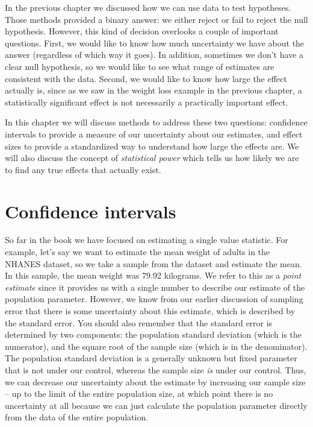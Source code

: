 \documentclass[
  12pt,
]{book}
\begin{document}
In the previous chapter we discussed how we can use data to test hypotheses. Those methods provided a binary answer: we either reject or fail to reject the null hypothesis. However, this kind of decision overlooks a couple of important questions. First, we would like to know how much uncertainty we have about the answer (regardless of which way it goes). In addition, sometimes we don't have a clear null hypothesis, so we would like to see what range of estimates are consistent with the data. Second, we would like to know how large the effect actually is, since as we saw in the weight loss example in the previous chapter, a statistically significant effect is not necessarily a practically important effect.

In this chapter we will discuss methods to address these two questions: confidence intervals to provide a measure of our uncertainty about our estimates, and effect sizes to provide a standardized way to understand how large the effects are. We will also discuss the concept of \emph{statistical power} which tells us how likely we are to find any true effects that actually exist.

\hypertarget{confidence-intervals}{%
\section{Confidence intervals}\label{confidence-intervals}}

So far in the book we have focused on estimating a single value statistic. For example, let's say we want to estimate the mean weight of adults in the NHANES dataset, so we take a sample from the dataset and estimate the mean. In this sample, the mean weight was 79.92 kilograms. We refer to this as a \emph{point estimate} since it provides us with a single number to describe our estimate of the population parameter. However, we know from our earlier discussion of sampling error that there is some uncertainty about this estimate, which is described by the standard error. You should also remember that the standard error is determined by two components: the population standard deviation (which is the numerator), and the square root of the sample size (which is in the denominator). The population standard deviation is a generally unknown but fixed parameter that is not under our control, whereas the sample size \emph{is} under our control. Thus, we can decrease our uncertainty about the estimate by increasing our sample size -- up to the limit of the entire population size, at which point there is no uncertainty at all because we can just calculate the population parameter directly from the data of the entire population.
\end{document}
